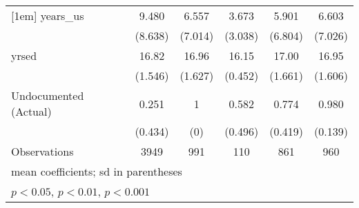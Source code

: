 \begin{table}[htbp]
\begin{tabular}{l*{5}{c}}
[1em]
years\_us            &       9.480         &       6.557         &       3.673         &       5.901         &       6.603         \\
                    &     (8.638)         &     (7.014)         &     (3.038)         &     (6.804)         &     (7.026)         \\
[1em]
yrsed               &       16.82         &       16.96         &       16.15         &       17.00         &       16.95         \\
                    &     (1.546)         &     (1.627)         &     (0.452)         &     (1.661)         &     (1.606)         \\
[1em]
Undocumented (Actual)&       0.251         &           1         &       0.582         &       0.774         &       0.980         \\
                    &     (0.434)         &         (0)         &     (0.496)         &     (0.419)         &     (0.139)         \\
\hline
Observations        &        3949         &         991         &         110         &         861         &         960         \\
\hline\hline
\multicolumn{6}{l}{\footnotesize mean coefficients; sd in parentheses}\\
\multicolumn{6}{l}{\footnotesize \sym{*} \(p<0.05\), \sym{**} \(p<0.01\), \sym{***} \(p<0.001\)}\\
\end{tabular}
\end{table}
